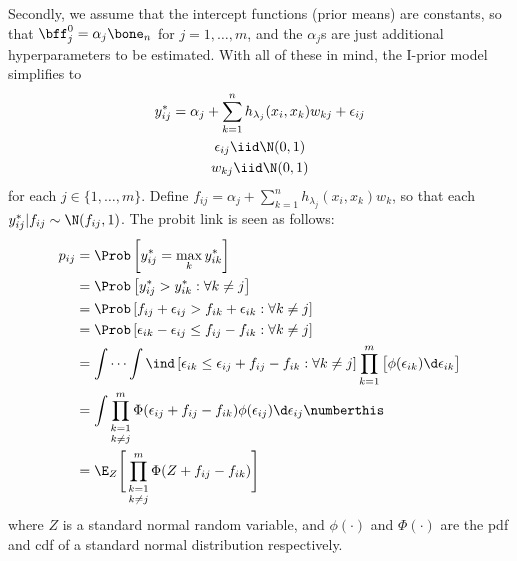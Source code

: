 \documentclass[]{article}
\begin{document}
Secondly, we assume that the intercept functions (prior means) are constants, so that $\bff^0_j = \alpha_j\bone_n$ for $j=1,\dots,m$, and the $\alpha_j$s are just additional hyperparameters to be estimated. With all of these in mind, the I-prior model simplifies to
\begin{gather*}
  y_{ij}^* = \alpha_j + \sum_{k=1}^n h_{\lambda_j}(x_i, x_{k})w_{kj} + \epsilon_{ij} \\
  \epsilon_{ij} \iid \N(0,1) \\
  w_{kj} \iid \N(0,1) 
\end{gather*}
for each $j \in \{1,\dots,m\}$. Define $f_{ij} = \alpha_j + \sum_{k=1}^n h_{\lambda_j}(x_i, x_{k})w_k$, so that each $y_{ij}^*|f_{ij} \sim \N(f_{ij}, 1)$. The probit link is seen as follows:
\begin{align*}
  p_{ij} 
  &= \Prob\left[y_{ij}^* = \max_k y_{ik}^* \right] \\
  &= \Prob\left[y_{ij}^* > y_{ik}^* : \forall k \neq j \right] \\
  &= \Prob\left[ 
  f_{ij} + \epsilon_{ij} > f_{ik} + \epsilon_{ik} : \forall k \neq j
   \right] \\
  &= \Prob\left[\epsilon_{ik} - \epsilon_{ij} \leq f_{ij} - f_{ik} : \forall k \neq j \right] \\
  &= \idotsint \ind\left[\epsilon_{ik} \leq \epsilon_{ij} + f_{ij} - f_{ik} : \forall k \neq j \right]
  \prod_{k=1}^m \big[ \phi(\epsilon_{ik}) \d\epsilon_{ik} \big] \\
  &= \int \mathop{\prod_{k=1}^m}_{k\neq j} \Phi(\epsilon_{ij} + f_{ij} - f_{ik})
    \phi(\epsilon_{ij}) \d\epsilon_{ij} \numberthis \label{eqn:probit-link} \\
  &= \E_Z \Bigg[ \mathop{\prod_{k=1}^m}_{k\neq j} \Phi(Z + f_{ij} - f_{ik}) \Bigg]
\end{align*}
where $Z$ is a standard normal random variable, and $\phi(\cdot)$ and $\Phi(\cdot)$ are the pdf and cdf of a standard normal distribution respectively. 
\end{document}
